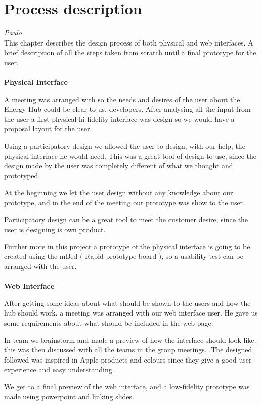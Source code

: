 \chapter{Process description}

\textit{Paulo}\\
This chapter describes the design process of both physical and web interfaces. A brief description of all the steps taken from scratch until a final prototype for the user.
\\
\\\textbf{Physical Interface}

A meeting was arranged with so the needs and desires of the user about the Energy Hub could be clear to us, developers. After analysing all the input from the user a first physical hi-fidelity interface was design so we would have a proposal layout for the user. 

Using a participatory design we allowed the user to design, with our help, the physical interface he would need. This was a great tool of design to use, since the design made by the user was completely different of what we thought and prototyped. 

At the beginning we let the user design without any knowledge about our prototype, and in the end of the meeting our prototype was show to the user.

Participatory design can be a great tool to meet the customer desire, since the user is designing is own product.

Further more in this project a prototype of the physical interface is going to be created using the mBed ( Rapid prototype board ), so a usability test can be arranged with the user.
\\
\\\textbf{Web Interface} 

After getting some ideas about what should be shown to the users and how the hub should work, a meeting was arranged with our web interface user. He gave us some requirements about what should be included in the web page.

In team we brainstorm and made a preview of how the interface should look like, this was then discussed with all the teams in the group meetings. .The designed followed was inspired in Apple products and colours since they give a good user experience and easy understanding.

We get to a final preview of the web interface, and a low-fidelity prototype was made using powerpoint and linking slides. 

